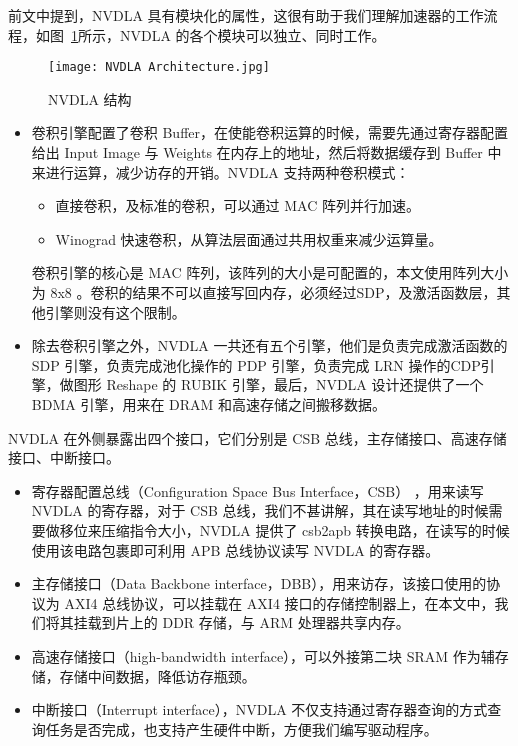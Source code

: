 前文中提到，NVDLA 具有模块化的属性，这很有助于我们理解加速器的工作流程，如图~\ref{fig:NVDLA Architecture}所示，NVDLA 的各个模块可以独立、同时工作。

\begin{figure}[!htbp]
    \centering
    \texttt{[image: NVDLA Architecture.jpg]}
    \caption{NVDLA 结构}
    \label{fig:NVDLA Architecture}
\end{figure}

\begin{itemize}
    \item 卷积引擎配置了卷积 Buffer，在使能卷积运算的时候，需要先通过寄存器配置给出 Input Image 与 Weights 在内存上的地址，然后将数据缓存到 Buffer 中来进行运算，减少访存的开销。NVDLA 支持两种卷积模式：
    \begin{itemize}
        \item 直接卷积，及标准的卷积，可以通过 MAC 阵列并行加速。
        \item Winograd 快速卷积，从算法层面通过共用权重来减少运算量。
    \end{itemize}
    卷积引擎的核心是 MAC 阵列，该阵列的大小是可配置的，本文使用阵列大小为 8x8 。卷积的结果不可以直接写回内存，必须经过SDP，及激活函数层，其他引擎则没有这个限制。
    \item 除去卷积引擎之外，NVDLA 一共还有五个引擎，他们是负责完成激活函数的 SDP 引擎，负责完成池化操作的 PDP 引擎，负责完成 LRN 操作的CDP引擎，做图形 Reshape 的 RUBIK 引擎，最后，NVDLA 设计还提供了一个 BDMA 引擎，用来在 DRAM 和高速存储之间搬移数据。
\end{itemize}

NVDLA 在外侧暴露出四个接口，它们分别是 CSB 总线，主存储接口、高速存储接口、中断接口。

\begin{itemize}
    \item 寄存器配置总线（Configuration Space Bus Interface，CSB） ，用来读写 NVDLA 的寄存器，对于 CSB 总线，我们不甚讲解，其在读写地址的时候需要做移位来压缩指令大小，NVDLA 提供了 csb2apb 转换电路，在读写的时候使用该电路包裹即可利用 APB 总线协议读写 NVDLA 的寄存器。
    \item 主存储接口（Data Backbone interface，DBB），用来访存，该接口使用的协议为 AXI4 总线协议，可以挂载在 AXI4 接口的存储控制器上，在本文中，我们将其挂载到片上的 DDR 存储，与 ARM 处理器共享内存。
    \item 高速存储接口（high-bandwidth interface），可以外接第二块 SRAM 作为辅存储，存储中间数据，降低访存瓶颈。
    \item 中断接口（Interrupt interface），NVDLA 不仅支持通过寄存器查询的方式查询任务是否完成，也支持产生硬件中断，方便我们编写驱动程序。
\end{itemize}

